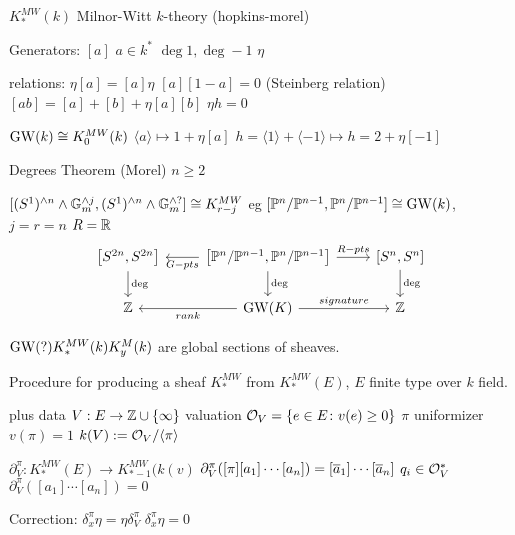 $K_*^{MW}(k)$ Milnor-Witt $k$-theory (hopkins-morel)

Generators: $[a]$ $a \in k^*$ $\deg 1, \deg -1$
$\eta$

relations:
$\eta[a]= [a] \eta$
$[a][1-a]=0$ (Steinberg relation)
$[ab]=[a]+[b]+\eta[a][b]$
$\eta h=0$

$\operatorname{GW}(k) \cong K^{MW}_0(k)$
$\langle a \rangle \mapsto 1+ \eta[a]$
$h= \langle 1 \rangle + \langle -1 \rangle \mapsto h= 2+ \eta[-1]$


Degrees Theorem (Morel) $n \geq 2$

$[(S^1)^{\wedge n} \wedge \mathbb{G}_m^{\wedge j}, (S^1)^{\wedge n} \wedge \mathbb{G}_m^{\wedge?}] \cong K^{MW}_{r-j}$
eg $[\mathbb{P}^n/\mathbb{P}^{n-1}, \mathbb{P}^n/\mathbb{P}^{n-1}] \cong \operatorname{GW}(k)$, $j=r=n$
$R= \mathbb{R}$
	\[
	\begin{tikzcd}
	\left[ S^{2n},S^{2n} \right] \arrow{d}{\deg} & \left[\P^n/\P^{n-1},\P^n/\P^{n-1}\right] \arrow{r}{R-pts} \arrow{l}{G-pts} \arrow{d}{\deg} & \left[S^n,S^n\right] \arrow{d}{\deg} \\
	\Z & \gw(K) \arrow{l}{rank} \arrow{r}{signature} & \Z 
	\end{tikzcd}
	\]

$\operatorname{GW}(?) K^{MW}_*(k) K_y^M(k)$ are global sections of sheaves.

Procedure for producing a sheaf
$K^{MW}_*$ from $K^{MW}_*(E)$, $E$ finite type over $k$ field.


plus data
$V: E \to \mathbb{Z} \cup \{\infty\}$ valuation
$\mathcal{O}_V= \{e \in E \colon v(e) \geq 0 \}$
$\pi$ uniformizer $v(\pi)= 1$
$k(V):= \mathcal{O}_V/ \langle \pi \rangle$

$\partial_V^\pi: K^{MW}_*(E) \to K_{*-1}^{MW}(k(v)$
$\partial^\pi_V([\pi][a_1]\cdots[a_n])= [\overline{a}_1]\cdots[\overline{a}_n]$
$q_i \in \mathcal{O}_V^*$ 
$\partial_V^\pi([a_1]\cdots[a_n])=0$



Correction: $\delta_x^\pi \eta= \eta \delta_V^\pi$
$\delta_x^\pi \eta = 0$









































